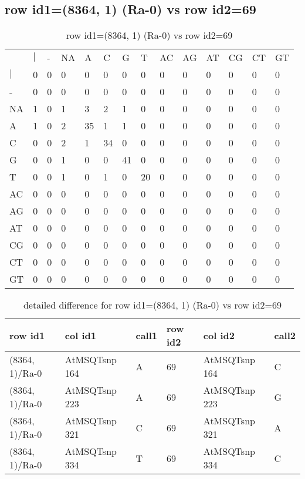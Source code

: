 \subsection{row id1=(8364, 1) (Ra-0) vs row id2=69}
\begin{center}
\begin{longtable}{|l|l|l|l|l|l|l|l|l|l|l|l|l|l|}
\caption{row id1=(8364, 1) (Ra-0) vs row id2=69} \label{table_dm588}\\
\hline
\\
\hline
&$|$&-&NA&A&C&G&T&AC&AG&AT&CG&CT&GT\\
$|$&0&0&0&0&0&0&0&0&0&0&0&0&0\\
-&0&0&0&0&0&0&0&0&0&0&0&0&0\\
NA&1&0&1&3&2&1&0&0&0&0&0&0&0\\
A&1&0&2&35&1&1&0&0&0&0&0&0&0\\
C&0&0&2&1&34&0&0&0&0&0&0&0&0\\
G&0&0&1&0&0&41&0&0&0&0&0&0&0\\
T&0&0&1&0&1&0&20&0&0&0&0&0&0\\
AC&0&0&0&0&0&0&0&0&0&0&0&0&0\\
AG&0&0&0&0&0&0&0&0&0&0&0&0&0\\
AT&0&0&0&0&0&0&0&0&0&0&0&0&0\\
CG&0&0&0&0&0&0&0&0&0&0&0&0&0\\
CT&0&0&0&0&0&0&0&0&0&0&0&0&0\\
GT&0&0&0&0&0&0&0&0&0&0&0&0&0\\
\hline
\end{longtable}
\end{center}

\begin{center}
\begin{longtable}{|l|l|l|l|l|l|}
\caption{detailed difference for row id1=(8364, 1) (Ra-0) vs row id2=69} \label{table_dm589}\\
\hline
row id1&col id1&call1&row id2&col id2&call2\\
\hline
(8364, 1)/Ra-0&AtMSQTsnp 164&A&69&AtMSQTsnp 164&C\\
(8364, 1)/Ra-0&AtMSQTsnp 223&A&69&AtMSQTsnp 223&G\\
(8364, 1)/Ra-0&AtMSQTsnp 321&C&69&AtMSQTsnp 321&A\\
(8364, 1)/Ra-0&AtMSQTsnp 334&T&69&AtMSQTsnp 334&C\\
\hline
\end{longtable}
\end{center}


